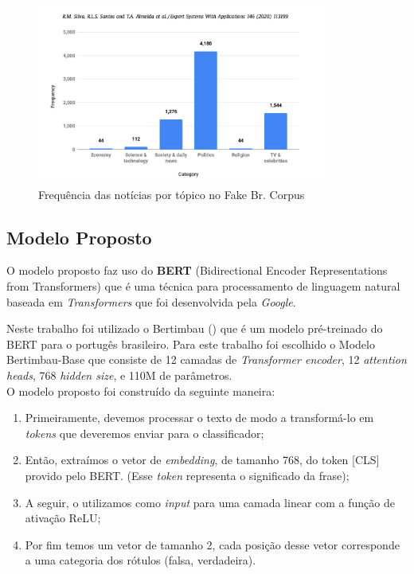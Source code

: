 \begin{figure}[hbt]
    \centering
    \includegraphics[width=0.85\textwidth]{Imagens/categorias_dataset.png}
    \caption{Frequência das notícias por tópico no Fake Br. Corpus}
    \label{fig:news_topic_dataset}
\end{figure}



\subsection{Modelo Proposto}



O modelo proposto faz uso do \textbf{BERT} (Bidirectional Encoder Representations from Transformers) que é uma técnica para processamento de linguagem natural baseada em \textit{Transformers} que foi desenvolvida pela \textit{Google}. 

Neste trabalho foi utilizado o Bertimbau (\cite{souza2020bertimbau}) que é um modelo pré-treinado do BERT para o portugês brasileiro. Para este trabalho foi escolhido o Modelo Bertimbau-Base que consiste de 12 camadas de \textit{Transformer encoder}, 12 \textit{attention heads}, 768 \textit{hidden size}, e 110M de parâmetros.\\

O modelo proposto foi construído da seguinte maneira: \\
\begin{enumerate}
    \item Primeiramente, devemos processar o texto de modo a transformá-lo em \textit{tokens} que deveremos enviar para o classificador;
    \item  Então, extraímos o vetor de \textit{embedding}, de tamanho 768, do token [CLS] provido pelo BERT. (Esse \textit{token} representa o significado da frase);
    \item A seguir, o utilizamos como \textit{input} para uma camada linear com a função de ativação ReLU;
    \item Por fim temos um vetor de tamanho 2, cada posição desse vetor corresponde a uma categoria dos rótulos (falsa, verdadeira).\\
\end{enumerate}


